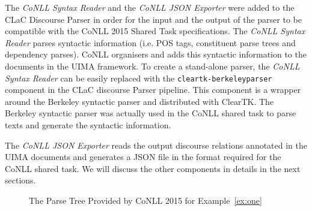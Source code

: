 \documentclass[11pt]{article}
\begin{document}
The \textit{CoNLL Syntax Reader} and the \textit{CoNLL JSON Exporter} were added to the CLaC Discourse Parser in order for the input and the output of the parser to be compatible with the CoNLL 2015 Shared Task specifications. The \textit{CoNLL Syntax Reader} parses syntactic information (i.e. POS tags, constituent parse trees and dependency parses). CoNLL organisers and adds this syntactic information to the documents in the UIMA framework. To create a stand-alone parser, the \textit{CoNLL Syntax Reader} can be easily replaced with the \texttt{cleartk-berkeleyparser} component in the CLaC discourse Parser pipeline. This component is a wrapper around the Berkeley syntactic parser \cite{petrov07}  and distributed with ClearTK. The Berkeley syntactic parser was actually used in the CoNLL shared task to parse texts and generate the syntactic information.

The \textit{CoNLL JSON Exporter} reads the output discourse relations annotated in the UIMA documents and generates a JSON file in the format required for the CoNLL shared task. We will discuss the other components in details in the next sections. 


\begin{figure}[!htb]
\centering

\caption{The Parse Tree Provided by CoNLL 2015 for Example~\ref{ex:one} }
\label{fig:example}
\end{figure}
\end{document}
